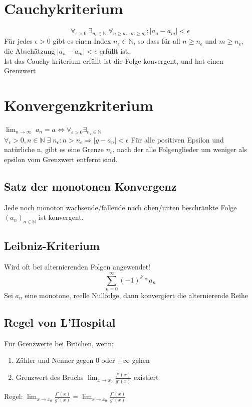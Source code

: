 \documentclass[12pt,a4paper]{article}
\begin{document}
\section{Cauchykriterium}
	$$\forall_{\epsilon>0}~\exists_{n_{\epsilon}\in\mathbb{N}} ~\forall_{n \geq n_{\epsilon}~, m \geq n_{\epsilon}}: | a_{n}-a_{m} | < \epsilon$$
	Für jedes $\epsilon > 0$ gibt es einen Index $n_{\epsilon} \in \mathbb{N}$, so dass für all $n\geq n_{\epsilon}$ und $m\geq n_{\epsilon}$,\\
	die Abschätzung $| a_{n}-a_{m} | < \epsilon$ erfüllt ist.\\
	Ist das Cauchy kriterium erfüllt ist die Folge konvergent, und hat einen Grenzwert

\section{Konvergenzkriterium}
	$\lim_{n \to \infty} \; a_n = a \Leftrightarrow \forall_{\varepsilon > 0} \exists _{n_\varepsilon \in  \mathbb{N}}$\\
	$\forall_\epsilon > 0, n \in \mathbb{N}\; \exists\; n_\epsilon: n > n_\epsilon \Rightarrow |g-a_n| < \epsilon $
	Für alle positiven Epsilon und natürliche n, gibt es eine Grenze $n_\epsilon $, nach der alle Folgenglieder um weniger als epsilon vom Grenzwert entfernt sind.\\ 

	\subsection{Satz der monotonen Konvergenz}
		Jede noch monoton wachsende/fallende nach oben/unten beschränkte Folge $(a_n)_{n \in \mathbb{N}}$ ist konvergent.\\

	\subsection{Leibniz-Kriterium}
		Wird oft bei alternierenden Folgen angewendet!\newline
		$$\sum^{\infty}_{n=0}{(-1)^k *a_n}$$
		Sei $a_n$ eine monotone, reelle Nullfolge, dann konvergiert die alternierende Reihe

	\subsection{Regel von L'Hospital}
		Für Grenzwerte bei Brüchen, wenn:
		\begin{enumerate}
			\item Zähler und Nenner gegen 0 oder $\pm \infty$ gehen
			\item Grenzwert des Bruchs $\lim_{x \to x_0} \frac{f'(x)}{g'(x)}$ existiert
		\end{enumerate}
		Regel: $\lim_{x \to x_0} \frac{f'(x)}{g'(x)} = \lim_{x \to x_0} \frac{f'(x)}{g'(x)}$
\end{document}
